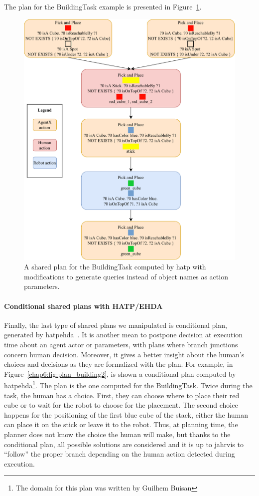 \documentclass[a4paper,11pt,twoside]{StyleThese}
\begin{document}
The plan for the BuildingTask example is presented in Figure~\ref{chap6:fig:plan_hatp}.

\begin{figure}[!htb]
	\centering
	\includegraphics[width=\linewidth]{figures/chapter2/plan_hatp.pdf}
	\caption{A shared plan for the BuildingTask computed by \acrshort{hatp} with modifications to generate \sparql{} queries instead of object names as action parameters.}
	\label{chap6:fig:plan_hatp}
\end{figure}
\thispagestyle{example}
\paragraph{Conditional shared plans with HATP/EHDA}
Finally, the last type of shared plans we manipulated is conditional plan, generated by \acrfull{hatpehda}~\cite{buisan_2021_human}. It is another mean to postpone decision at execution time about an agent actor or parameters, with plans where branch junctions concern human decision. Moreover, it gives a better insight about the human's choices and decisions as they are formalized with the plan. For example, in Figure~\ref{chap6:fig:plan_building2}, is shown a conditional plan computed by \acrshort{hatpehda}\footnote{The domain for this plan was written by Guilhem Buisan}. The plan is the one computed for the BuildingTask. Twice during the task, the human has a choice. First, they can choose where to place their red cube or to wait for the robot to choose for the placement. The second choice happens for the positioning of the first blue cube of the stack, either the human can place it on the stick or leave it to the robot. Thus, at planning time, the planner does not know the choice the human will make, but thanks to the conditional plan, all possible solutions are considered and it is up to \acrshort{jahrvis} to ``follow'' the proper branch depending on the human action detected during execution.
\end{document}
